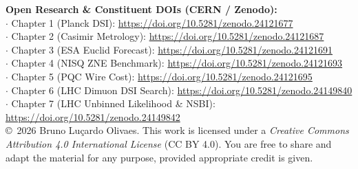 \documentclass[11pt,a4paper,openany]{book}
\begin{document}
\vspace{0.4cm}
\noindent \textbf{Open Research \& Constituent DOIs (CERN / Zenodo):}\\
$\cdot$ Chapter 1 (Planck DSI): \url{https://doi.org/10.5281/zenodo.24121677}\\
$\cdot$ Chapter 2 (Casimir Metrology): \url{https://doi.org/10.5281/zenodo.24121687}\\
$\cdot$ Chapter 3 (ESA Euclid Forecast): \url{https://doi.org/10.5281/zenodo.24121691}\\
$\cdot$ Chapter 4 (NISQ ZNE Benchmark): \url{https://doi.org/10.5281/zenodo.24121693}\\
$\cdot$ Chapter 5 (PQC Wire Cost): \url{https://doi.org/10.5281/zenodo.24121695}\\
$\cdot$ Chapter 6 (LHC Dimuon DSI Search): \url{https://doi.org/10.5281/zenodo.24149840}\\
$\cdot$ Chapter 7 (LHC Unbinned Likelihood \& NSBI): \url{https://doi.org/10.5281/zenodo.24149842}\\

\vspace{0.5cm}
\noindent \copyright\ 2026 Bruno Lu\c{c}ardo Olivaes. This work is licensed under a \textit{Creative Commons Attribution 4.0 International License} (CC BY 4.0). You are free to share and adapt the material for any purpose, provided appropriate credit is given.
\vspace{1cm}

\tableofcontents



\mainmatter









\backmatter

\appendix




\end{document}
